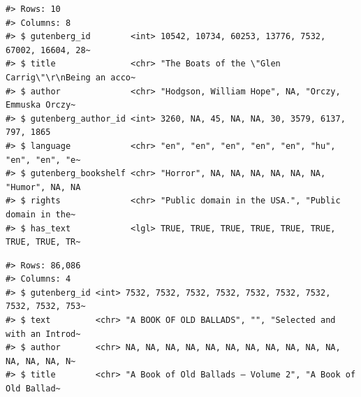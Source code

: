 \documentclass[
  letterpaper,
]{latex/krantz}
\newenvironment{Shaded}{\begin{snugshade}}{\end{snugshade}}
\newcommand{\AttributeTok}[1]{\textcolor[rgb]{0.40,0.45,0.13}{#1}}
\newcommand{\CommentTok}[1]{\textcolor[rgb]{0.37,0.37,0.37}{#1}}
\newcommand{\FunctionTok}[1]{\textcolor[rgb]{0.28,0.35,0.67}{#1}}
\newcommand{\NormalTok}[1]{\textcolor[rgb]{0.00,0.23,0.31}{#1}}
\newcommand{\OtherTok}[1]{\textcolor[rgb]{0.00,0.23,0.31}{#1}}
\newcommand{\SpecialCharTok}[1]{\textcolor[rgb]{0.37,0.37,0.37}{#1}}
\newcommand{\StringTok}[1]{\textcolor[rgb]{0.13,0.47,0.30}{#1}}
\begin{document}
\begin{verbatim}
#> Rows: 10
#> Columns: 8
#> $ gutenberg_id        <int> 10542, 10734, 60253, 13776, 7532, 67002, 16604, 28~
#> $ title               <chr> "The Boats of the \"Glen Carrig\"\r\nBeing an acco~
#> $ author              <chr> "Hodgson, William Hope", NA, "Orczy, Emmuska Orczy~
#> $ gutenberg_author_id <int> 3260, NA, 45, NA, NA, 30, 3579, 6137, 797, 1865
#> $ language            <chr> "en", "en", "en", "en", "en", "hu", "en", "en", "e~
#> $ gutenberg_bookshelf <chr> "Horror", NA, NA, NA, NA, NA, NA, "Humor", NA, NA
#> $ rights              <chr> "Public domain in the USA.", "Public domain in the~
#> $ has_text            <lgl> TRUE, TRUE, TRUE, TRUE, TRUE, TRUE, TRUE, TRUE, TR~
\end{verbatim}

\begin{Shaded}
\end{Shaded}

\begin{Shaded}
\end{Shaded}

\begin{verbatim}
#> Rows: 86,086
#> Columns: 4
#> $ gutenberg_id <int> 7532, 7532, 7532, 7532, 7532, 7532, 7532, 7532, 7532, 753~
#> $ text         <chr> "A BOOK OF OLD BALLADS", "", "Selected and with an Introd~
#> $ author       <chr> NA, NA, NA, NA, NA, NA, NA, NA, NA, NA, NA, NA, NA, NA, N~
#> $ title        <chr> "A Book of Old Ballads — Volume 2", "A Book of Old Ballad~
\end{verbatim}
\end{document}
